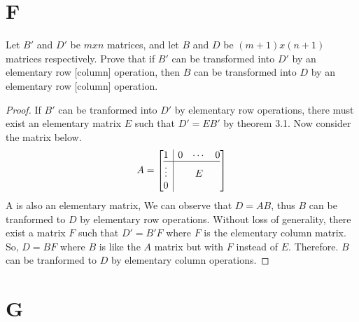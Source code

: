\documentclass[11pt]{scrartcl}
\begin{document}
\section{F}
Let $B'$ and $D'$ be $mxn$ matrices, and let $B$ and $D$ be $(m + 1)x(n + 1)$ matrices respectively. 
Prove that if $B'$ can be transformed into $D'$ by an elementary row [column] operation, then $B$ can be transformed
into $D$ by an elementary row [column] operation.
\begin{proof}
If $B'$ can be tranformed into $D'$ by elementary row operations, there must exist an elementary matrix $E$ 
such that $D'=EB'$ by theorem 3.1. Now consider the matrix below.
\[
A=
\left[\begin{array}{@{}c|ccc@{}}
1 & 0 &\cdots &0 \\ \hline
\vdots & & E & \\
0 & & &
\end{array}\right]	
\]
A is also an elementary matrix, 
We can observe that $D = AB$, thus $B$ can be tranformed to $D$ by elementary row operations.
Without loss of generality, there exist a matrix $F$ such that $D' = B'F$ where $F$ is the elementary column matrix.
So, $D = BF$ where $B$ is like the $A$ matrix but with $F$ instead of $E$. Therefore. $B$ can be tranformed
to $D$ by elementary column operations. 
\end{proof}

\section{G}
\end{document}
